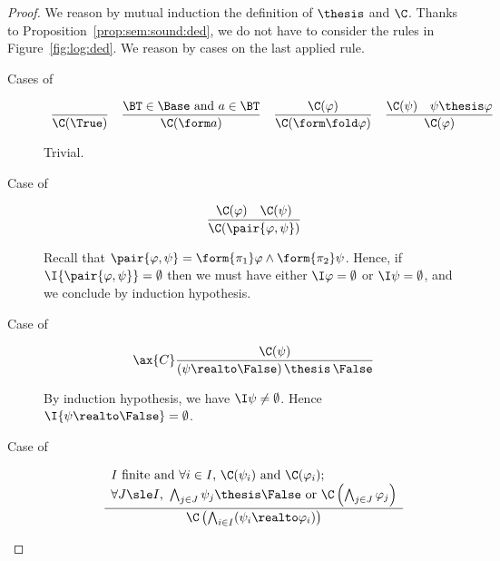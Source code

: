 \begin{proof}
We reason by mutual induction the definition of $\thesis$ and $\C$.
Thanks to Proposition~\ref{prop:sem:sound:ded},
we do not have to consider the rules in Figure~\ref{fig:log:ded}.
We reason by cases on the last applied rule.
\begin{description}
\item[Cases of]
\[
\begin{array}{c}

\dfrac{}{\C(\True)}

\quad

\dfrac
  {\text{$\BT \in \Base$ and $a \in \BT$}}
  {\C(\form a)}

\quad

\dfrac{\C(\varphi)}
  {\C(\form\fold \varphi)}

\quad

\dfrac{\C(\psi)
  \quad
  \psi \thesis \varphi}
  {\C(\varphi)}

\end{array}
\]

\noindent
Trivial.

\item[Case of]
\[
\dfrac{\C(\varphi) 
  \quad
  \C(\psi)}
  {\C(\pair{\varphi,\psi})}
\]

\noindent
Recall that $\pair{\varphi,\psi} = \form{\pi_1}\varphi \land \form{\pi_2}\psi$.
Hence, if $\I{\pair{\varphi,\psi}} = \emptyset$ then we must have
either $\I\varphi = \emptyset$ or $\I\psi = \emptyset$,
and we conclude by induction hypothesis.

\item[Case of]
\[
\ax{C}
\dfrac{\C(\psi)}
  {(\psi \realto \False) \,\thesis\, \False}
\]

By induction hypothesis, we have $\I\psi \neq \emptyset$.
Hence $\I{\psi \realto \False} = \emptyset$.

\item[Case of]
\[
\dfrac{\begin{array}{l}
  \text{$I$ finite and $\forall i \in I$,}~
  \C(\psi_i) 
  ~\text{and}~
  \C(\varphi_i) ;
  \\
  \text{$\forall J \sle I$,}~
  \bigwedge_{j \in J} \psi_j \thesis \False
  ~\text{or}~
  \C\left( \bigwedge_{j \in J} \varphi_j \right)
  \end{array}}
  {\C\left( \bigwedge_{i \in I}(\psi_i \realto \varphi_i) \right)}
\]


\end{description}
\end{proof}
